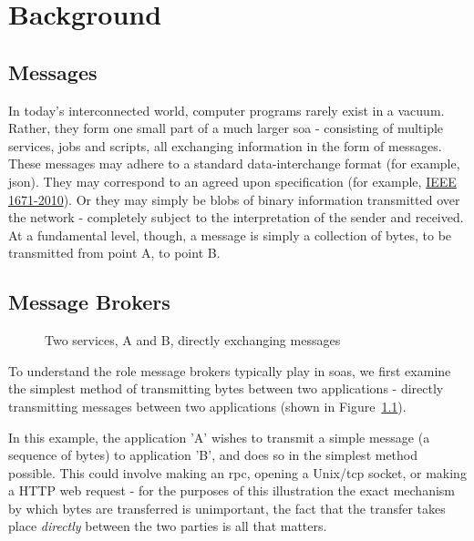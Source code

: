 \chapter{Background}
\label{chap:Background}

\section{Messages}
\label{sec:messages}

In today's interconnected world, computer programs rarely exist in a vacuum.
Rather, they form one small part of a much larger \gls{soa} -
consisting of multiple services, jobs and scripts, all exchanging information in
the form of messages. These messages may adhere to a standard data-interchange
format (for example, \gls{json}). They may correspond to an agreed upon
specification (for example, \href{https://goo.gl/rjuP4C}{IEEE 1671-2010}).
Or they may simply be blobs of binary information transmitted over the network -
completely subject to the interpretation of the sender and received.
At a fundamental level, though, a message is simply a collection of bytes, to be
transmitted from point A, to point B.

\section{Message Brokers}
\label{sec:brokers}

\begin{figure}[ht]
  \centering
  
  \caption{Two services, A and B, directly exchanging messages}
  \label{fig:tikz:directMessaging}
\end{figure}

To understand the role message brokers typically play in \glspl{soa}, we first
examine the simplest method of transmitting bytes between two applications -
directly transmitting messages between two applications (shown in
Figure~\ref{fig:tikz:directMessaging}).

In this example, the application 'A' wishes to transmit a simple message (a
sequence of bytes) to application 'B', and does so in the simplest method
possible. This could involve making an \gls{rpc}, opening a Unix/\gls{tcp}
socket, or making a HTTP web request - for the purposes of this illustration the
exact mechanism by which bytes are transferred is unimportant, the fact that the
transfer takes place \emph{directly} between the two parties is all that
matters.

